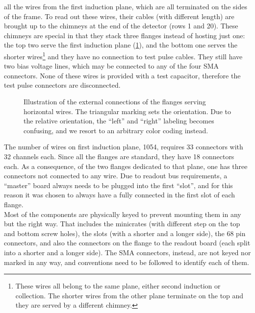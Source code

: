 all the wires from the first induction plane, which are all terminated on the
sides of the frame.
To read out these wires, their cables (with different length) are brought up to
the chimneys at the end of the detector (rows 1 and 20).
These chimneys are special in that they stack three flanges instead of hosting
just one: the top two serve the first induction plane
(\cref{fig:HorizontalWireChimney}), and the bottom one serves the shorter
wires\footnote{%
These wires all belong to the same plane, either second induction or collection.
The shorter wires from the other plane terminate on the top and they are served
by a different chimney.
}
and they have no connection to test pulse cables.
They still have two bias voltage lines, which may be connected to any of the
four SMA connectors. None of these wires is provided with a test capacitor,
therefore the test pulse connectors are disconnected.
\begin{figure}
  \caption{\label{fig:HorizontalWireChimney}
    Illustration of the external connections of the flanges serving horizontal
    wires.
    The triangular marking sets the orientation.
    Due to the relative orientation, the ``left'' and ``right'' labeling becomes
    confusing, and we resort to an arbitrary color coding instead.
  }
\end{figure}
The number of wires on first induction plane, 1054, requires 33 connectors with
32 channels each.
Since all the flanges are standard, they have 18 connectors each.
As a consequence, of the two flanges dedicated to that plane, one has three
connectors not connected to any wire.
Due to readout bus requirements, a ``master'' board always needs to be plugged
into the first ``slot'', and for this reason it was chosen to always have a
fully connected \DBB in the first slot of each flange.
\\
Most of the components are physically keyed to prevent mounting them in any but
the right way.
That includes the minicrates (with different step on the top and bottom screw
holes), the slots (with a shorter and a longer side), the 68 pin connectors,
and also the connectors on the flange to the readout board (each split into a
shorter and a longer side).
The SMA connectors, instead, are not keyed nor marked in any way, and
conventions need to be followed to identify each of them.

